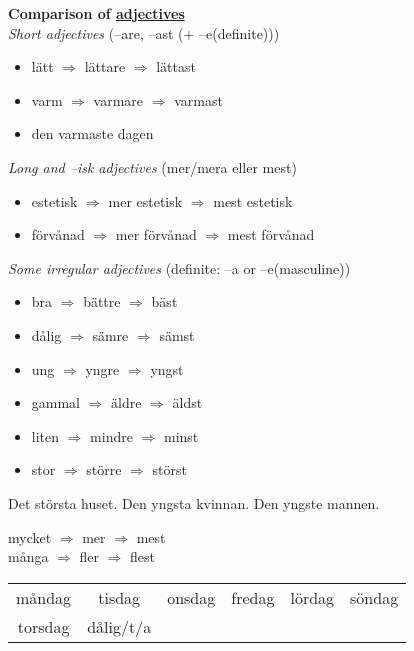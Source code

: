 
\begin{flushleft}
    \textbf{Comparison of \underline{adjectives}} \\
    \textsl{Short adjectives} (--are, --ast ($+$ --e(definite)))
    \begin{itemize}
        \item lätt $\Rightarrow$ lättare $\Rightarrow$ lättast
        \item varm $\Rightarrow$ varmare $\Rightarrow$ varmast
        \item den varmaste dagen
    \end{itemize}

    \textsl{Long and --isk adjectives} (mer/mera eller mest)
    \begin{itemize}
        \item estetisk $\Rightarrow$ mer estetisk $\Rightarrow$ mest estetisk
        \item förvånad $\Rightarrow$ mer förvånad $\Rightarrow$ mest förvånad
    \end{itemize}

    \textsl{Some irregular adjectives} (definite: --a or --e(masculine))
    \begin{itemize}
        \item bra $\Rightarrow$ bättre $\Rightarrow$ bäst
        \item dålig $\Rightarrow$ sämre $\Rightarrow$ sämst
        \item ung $\Rightarrow$ yngre $\Rightarrow$ yngst
        \item gammal $\Rightarrow$ äldre $\Rightarrow$ äldst
        \item liten $\Rightarrow$ mindre $\Rightarrow$ minst
        \item stor $\Rightarrow$ större $\Rightarrow$ störst
    \end{itemize}
    Det största huset. Den yngsta kvinnan. Den yngste mannen.

    mycket $\Rightarrow$ mer $\Rightarrow$ mest \\
    många $\Rightarrow$ fler $\Rightarrow$ flest
\end{flushleft}

\begin{center}
    \begin{tabular}{|c c c c c c|}
        \hline
        måndag & tisdag & onsdag & fredag & lördag & söndag \\
        torsdag & dålig/t/a &&&& \\
        \hline
    \end{tabular}
\end{center}

